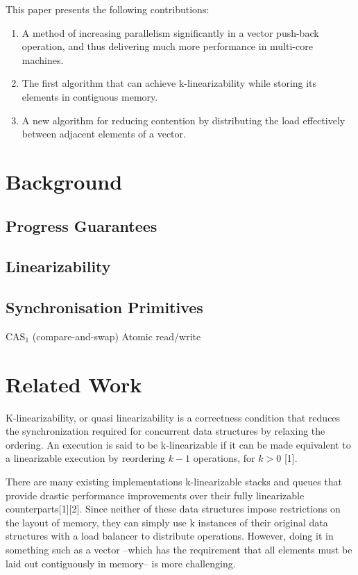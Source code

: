 \documentclass{sigplanconf}
\begin{document}
This paper presents the following contributions:
\begin{enumerate}
\item A method of increasing parallelism significantly in a vector push-back
operation, and thus delivering much more performance in multi-core
machines.
\item The first algorithm that can achieve k-linearizability while storing
its elements in contiguous memory.
\item A new algorithm for reducing contention by distributing the load effectively
between adjacent elements of a vector.
\end{enumerate}

\section{Background}


\subsection{Progress Guarantees}


\subsection{Linearizability}

\subsection{Synchronisation Primitives}
CAS$_1$ (compare-and-swap)
Atomic read/write

\section{Related Work}

K-linearizability, or quasi linearizability is a correctness condition
that reduces the synchronization required for concurrent data structures
by relaxing the ordering. An execution is said to be k-linearizable
if it can be made equivalent to a linearizable execution by reordering
$k-1$ operations, for $k>0$ {[}1{]}.

There are many existing implementations k-linearizable stacks and
queues that provide drastic performance improvements over their fully
linearizable counterparts{[}1{]}{[}2{]}. Since neither of these data
structures impose restrictions on the layout of memory, they can simply
use k instances of their original data structures with a load balancer
to distribute operations. However, doing it in something such as a
vector --which has the requirement that all elements must be laid
out contiguously in memory-- is more challenging.
\end{document}
